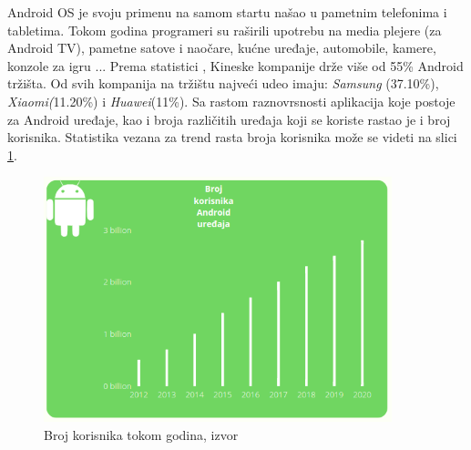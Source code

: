 \documentclass[android.tex]{subfiles}
\begin{document}
Android OS je svoju primenu na samom startu našao u pametnim telefonima i tabletima. Tokom godina programeri su raširili upotrebu na media plejere (za Android TV), pametne satove i naočare, kućne uređaje, automobile, kamere, konzole za igru \cite{sajt:androidDevelopers}...   Prema statistici \cite{sajt:statistika}, Kineske kompanije drže više od 55\% Android tržišta. Od svih kompanija na tržištu najveći udeo imaju:\textit{ Samsung} (37.10\%), \textit{Xiaomi(}11.20\%) i \textit{Huawei}(11\%). Sa rastom raznovrsnosti aplikacija koje postoje za Android uređaje, kao i broja različitih uređaja koji se koriste rastao je i broj korisnika. Statistika vezana za trend rasta broja korisnika može se videti na slici \ref{fig:brKorisnika}.

\begin{figure}[!ht]
  \centering
  \label{fig:brKorisnika}
  \includegraphics[width=0.9\textwidth]{brKorisnika.png}
  \caption{Broj korisnika tokom godina, izvor \cite{sajt:statistika}}
\end{figure}
\end{document}
